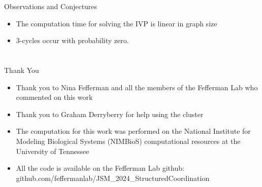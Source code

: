 \documentclass{beamer}
\begin{document}
\begin{frame}{Observations and Conjectures}
	\begin{itemize}
		\item The computation time for solving the IVP is linear in graph size
		\item $3$-cycles occur with probability zero. 
	\end{itemize}
\end{frame}

\section*{}
\begin{frame}{Thank You}
	\begin{itemize}
		\item Thank you to Nina Fefferman and all the members of the Fefferman Lab who commented on this work
		\item Thank you to Graham Derryberry for help using the cluster
		\item The computation for this work was performed on the National Institute for Modeling Biological Systems (NIMBioS) computational resources at the University of Tennessee
		\item All the code is available on the Fefferman Lab github: github.com/feffermanlab/JSM\_2024\_StructuredCoordination
	\end{itemize}
\end{frame}
\end{document}
